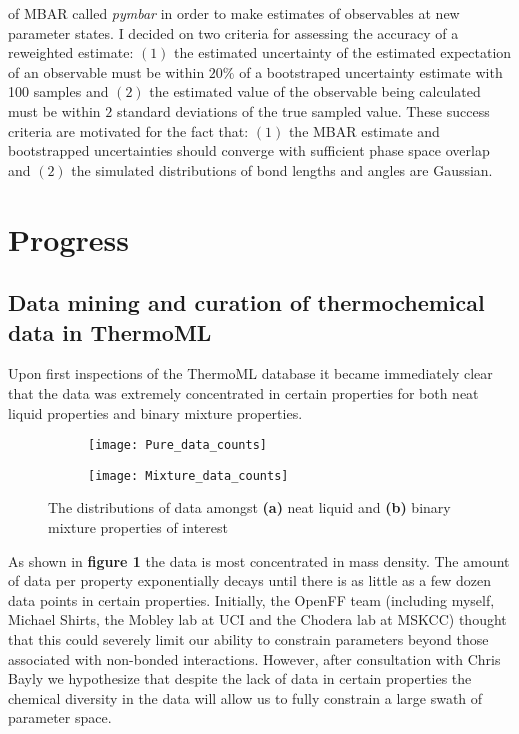 \documentclass[rmp,nofootinbib,superscriptaddress,12pt,tightenlines,notitlepage]{revtex4-1}
\begin{document}
of MBAR called \textit{pymbar} in order to make estimates of observables at new parameter states. I decided on two criteria for assessing the accuracy
of a reweighted estimate: $\left(1\right)$ the estimated uncertainty of the estimated expectation of an observable must be within $20 \%$ of a bootstraped uncertainty estimate with 100 samples and $\left(2\right)$ the estimated value of the observable being calculated must be within $2$ standard deviations of the true
sampled value. These success criteria are motivated for the fact that: $\left(1\right)$ the MBAR estimate and bootstrapped uncertainties should converge with 
sufficient phase space overlap and $\left(2\right)$ the simulated distributions of bond lengths and angles are Gaussian. 
\section{Progress}
\subsection{Data mining and curation of thermochemical data in ThermoML}
Upon first inspections of the ThermoML database it became immediately clear that the data was extremely concentrated in certain properties for both 
neat liquid properties and binary mixture properties. 
\begin{figure}[h!]
\centering
\begin{subfigure}{.5\textwidth}
  \centering
  \texttt{[image: Pure\_data\_counts]}
  \label{fig:sub1}
\end{subfigure}%
\begin{subfigure}{.5\textwidth}
  \centering
  \texttt{[image: Mixture\_data\_counts]}
  \label{fig:sub2}
\end{subfigure}
\caption{The distributions of data amongst \textbf{(a)} neat liquid and \textbf{(b)} binary mixture properties of interest}
\label{fig:test}
\end{figure}
As shown in \textbf{figure 1} the data is most concentrated in mass density. The amount of data per property exponentially decays
until there is as little as a few dozen data points in certain properties. Initially, the OpenFF team (including myself, Michael Shirts, the 
Mobley lab at UCI and the Chodera lab at MSKCC) thought that this could severely limit our ability to constrain parameters beyond those 
associated with non-bonded interactions. However, after consultation with Chris Bayly we hypothesize that despite the lack of data in certain properties
the chemical diversity in the data will allow us to fully constrain a large swath of parameter space.
\end{document}
